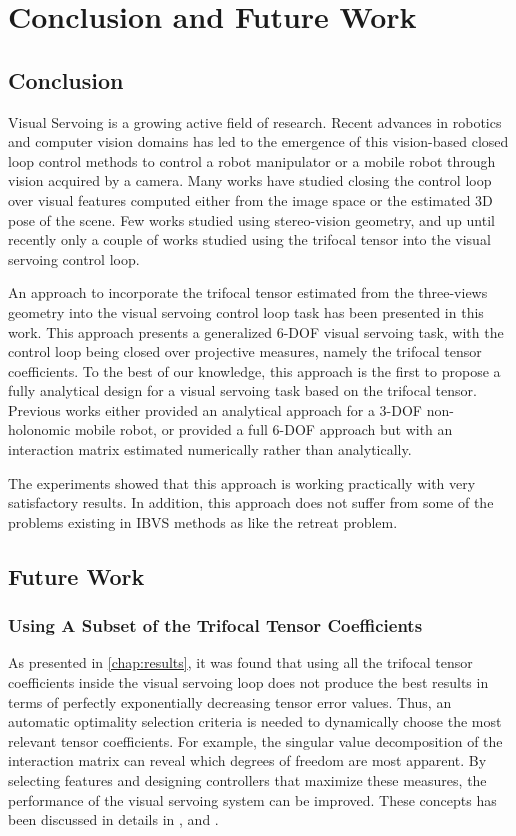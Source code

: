 \chapter{Conclusion and Future Work} \label{chap:conclusion}

\section{Conclusion}
Visual Servoing is a growing active field of research. Recent advances in robotics and computer vision domains has led to the emergence of this vision-based closed loop control methods to control a robot manipulator or a mobile robot through vision acquired by a camera. Many works have studied closing the control loop over visual features computed either from the image space or the estimated 3D pose of the scene. Few works studied using stereo-vision geometry, and up until recently only a couple of works studied using the trifocal tensor into the visual servoing control loop.

An approach to incorporate the trifocal tensor estimated from the three-views geometry into the visual servoing control loop task has been presented in this work. This approach presents a generalized 6-DOF visual servoing task, with the control loop being closed over projective measures, namely the trifocal tensor coefficients. To the best of our knowledge, this approach is the first to propose a fully analytical design for a visual servoing task based on the trifocal tensor. Previous works either provided an analytical approach for a 3-DOF non-holonomic mobile robot, or provided a full 6-DOF approach but with an interaction matrix estimated numerically rather than analytically.

The experiments showed that this approach is working practically with very satisfactory results. In addition, this approach does not suffer from some of the problems existing in IBVS methods as like the retreat problem.

\section{Future Work}\label{sec:futurework}
\subsection{Using A Subset of the Trifocal Tensor Coefficients}
As presented in \ref{chap:results}, it was found that using all the trifocal tensor coefficients inside the visual servoing loop does not produce the best results in terms of perfectly exponentially decreasing tensor error values. Thus, an automatic optimality selection criteria is needed to dynamically choose the most relevant tensor coefficients. For example, the singular value decomposition of the interaction matrix can reveal which degrees of freedom are most apparent. By selecting features and designing controllers that maximize these measures, the performance of the visual servoing system can be improved. These concepts has been discussed in details in \cite{chaumette2007visual}, \cite{538976} and \cite{611333}.
\vspace{-1em}
